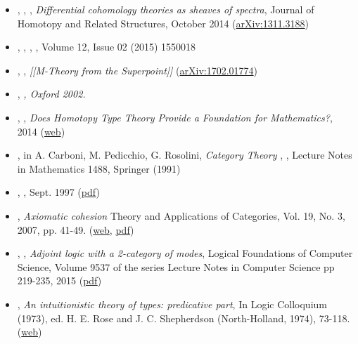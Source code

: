 \documentclass[12pt,titlepage]{article}
\theoremstyle{plain}
\theoremstyle{definition}
\theoremstyle{remark}
\begin{document}
\begin{itemize}%
\item {}, , , \emph{Differential cohomology theories as sheaves of spectra}, Journal of Homotopy and Related Structures, October 2014 (\href{http://arxiv.org/abs/1311.3188}{arXiv:1311.3188})
\item {}, , , , Volume 12, Issue 02 (2015) 1550018
\item {}, , \emph{[[M-Theory from the Superpoint]]} (\href{https://arxiv.org/abs/1702.01774}{arXiv:1702.01774})
\item {}, \emph{, Oxford 2002.}
\item {}, , \emph{Does Homotopy Type Theory Provide a Foundation for Mathematics?}, 2014 (\href{http://philsci-archive.pitt.edu/11143/}{web})
\item {},  in A. Carboni, M. Pedicchio, G. Rosolini, \emph{Category Theory} , , Lecture Notes in Mathematics 1488, Springer (1991)
\item {}, , Sept. 1997 (\href{http://www.acsu.buffalo.edu/~wlawvere/ToposMotion.pdf}{pdf})
\item {}, \emph{Axiomatic cohesion} Theory and Applications of Categories, Vol. 19, No. 3, 2007, pp. 41-49. (\href{http://www.tac.mta.ca/tac/volumes/19/3/19-03abs.html}{web}, \href{http://www.tac.mta.ca/tac/volumes/19/3/19-03.pdf}{pdf})
\item {}, , \emph{Adjoint logic with a 2-category of modes}, Logical Foundations of Computer Science, Volume 9537 of the series Lecture Notes in Computer Science pp 219-235, 2015 (\href{http://dlicata.web.wesleyan.edu/pubs/ls15adjoint/ls15adjoint.pdf}{pdf})
\item {}, \emph{An intuitionistic theory of types: predicative part}, In Logic Colloquium (1973), ed. H. E. Rose and J. C. Shepherdson (North-Holland, 1974), 73-118. (\href{http://citeseerx.ist.psu.edu/viewdoc/summary?doi=10.1.1.131.926}{web})

\end{itemize}
\end{document}
